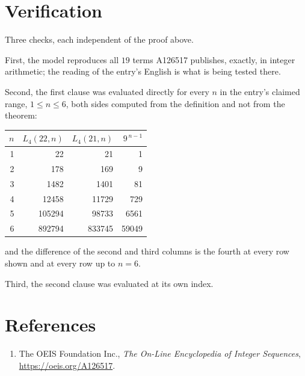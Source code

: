 \documentclass[11pt,a4paper]{article}
\theoremstyle{plain}
\theoremstyle{definition}
\begin{document}
\section{Verification}

Three checks, each independent of the proof above.

First, the model reproduces all $19$ terms A126517 publishes, exactly, in integer
arithmetic; the reading of the entry's English is what is being tested there.

Second, the first clause was evaluated directly for every $n$ in the entry's claimed range,
$1\le n\le6$, both sides computed from the definition and not from the theorem:

\begin{center}
\begin{tabular}{rrrr}
$n$ & $L_{4}(22,n)$ & $L_{4}(21,n)$ & $9^{\,n-1}$ \\ \hline
1 & 22 & 21 & 1 \\
2 & 178 & 169 & 9 \\
3 & 1482 & 1401 & 81 \\
4 & 12458 & 11729 & 729 \\
5 & 105294 & 98733 & 6561 \\
6 & 892794 & 833745 & 59049 \\
\end{tabular}
\end{center}

\noindent and the difference of the second and third columns is the fourth at every row shown
and at every row up to $n=6$.

Third, the second clause was evaluated at its own index.

\section*{References}
\begin{enumerate}
\item The OEIS Foundation Inc., \emph{The On-Line Encyclopedia of Integer Sequences},
\url{https://oeis.org/A126517}.
\end{enumerate}
\end{document}

